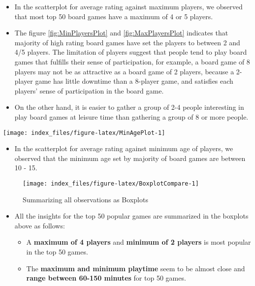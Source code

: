 \documentclass[
]{article}
\providecommand{\tightlist}{%
  \setlength{\itemsep}{0pt}\setlength{\parskip}{0pt}}
\begin{document}
\begin{itemize}
\item
  In the scatterplot for average rating against maximum players, we observed that most top 50 board games have a maximum of 4 or 5 players.
\item
  The figure \ref{fig:MinPlayersPlot} and \ref{fig:MaxPlayersPlot} indicates that majority of high rating board games have set the players to between 2 and 4/5 players. The limitation of players suggest that people tend to play board games that fulfills their sense of participation, for example, a board game of 8 players may not be as attractive as a board game of 2 players, because a 2-player game has little downtime than a 8-player game, and satisfies each players' sense of participation in the board game.
\item
  On the other hand, it is easier to gather a group of 2-4 people interesting in play board games at leisure time than gathering a group of 8 or more people.
\end{itemize}

\begin{center}\texttt{[image: index\_files/figure-latex/MinAgePlot-1]} \end{center}

\begin{itemize}
\tightlist
\item
  In the scatterplot for average rating against minimum age of players, we observed that the minimum age set by majority of board games are between 10 - 15.
\end{itemize}

\begin{figure}[H]

{\centering \texttt{[image: index\_files/figure-latex/BoxplotCompare-1]} 

}

\caption{Summarizing all observations as Boxplots}\label{fig:BoxplotCompare}
\end{figure}

\begin{itemize}
\tightlist
\item
  All the insights for the top 50 popular games are summarized in the boxplots above as follows:

  \begin{itemize}
  \tightlist
  \item
    A \textbf{maximum of 4 players} and \textbf{minimum of 2 players} is most popular in the top 50 games.
  \item
    The \textbf{maximum and minimum playtime} seem to be almost close and \textbf{range between 60-150 minutes} for top 50 games.
  \end{itemize}
\end{itemize}
\end{document}
